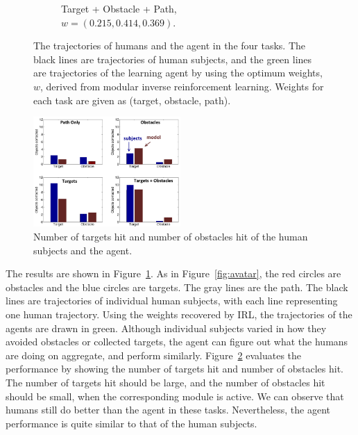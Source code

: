 \documentclass[11pt]{article} %
\begin{document}
\begin{figure}[h]
\begin{subfigure}[b]{0.24\textwidth}
\caption{Target + Obstacle + Path, \\$w = (0.215, 0.414, 0.369)$. }
\end{subfigure}
\caption{The trajectories of humans and the agent in the four tasks. The
black lines are trajectories of human subjects, and the green lines are
trajectories of the learning agent by using the optimum weights, $w$, derived
from modular inverse reinforcement learning. Weights for each task are given as (target,
obstacle, path).}

\label{fig:exp}
\end{figure}

\begin{figure}[h]
\centering
\includegraphics[width=0.5\textwidth]{contactStats.png}
\caption{Number of targets hit and number of obstacles hit of the human subjects
and the agent.}
\label{fig:stats}
\end{figure}

The results are shown in Figure~\ref{fig:exp}. As in Figure~\ref{fig:avatar},
the red circles are obstacles and the blue circles are targets. The gray lines
are the path. The black lines are trajectories of individual human subjects,
with each line representing one human trajectory.  Using the weights recovered
by IRL, the trajectories of the agents are drawn in green. Although individual
subjects varied in how they avoided obstacles or collected targets, the agent
can figure out what the humans are doing on aggregate, and perform similarly.
Figure~\ref{fig:stats} evaluates the performance by showing the number of
targets hit and number of obstacles hit.  The number of targets hit should be
large, and the number of obstacles hit should be small, when the corresponding
module is active.  We can observe that humans still do better than the agent in
these tasks.  Nevertheless, the agent performance is quite similar to that of
the human subjects.
\end{document}
